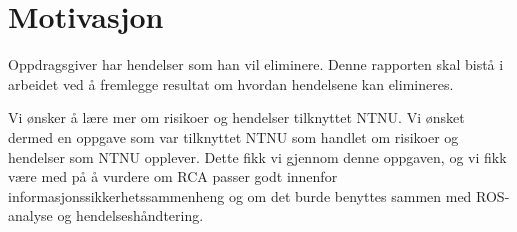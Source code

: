 \section{Motivasjon}
\label{sec:motivasjon}
Oppdragsgiver har hendelser som han vil eliminere. Denne rapporten skal bistå i arbeidet ved å fremlegge resultat om hvordan hendelsene kan elimineres. 


Vi ønsker å lære mer om risikoer og hendelser tilknyttet NTNU. Vi ønsket dermed en oppgave som var tilknyttet NTNU som handlet om risikoer og hendelser som NTNU opplever. Dette fikk vi gjennom denne oppgaven, og vi fikk være med på å vurdere om RCA passer godt innenfor informasjonssikkerhetssammenheng og om det burde benyttes sammen med ROS-analyse og hendelseshåndtering.  